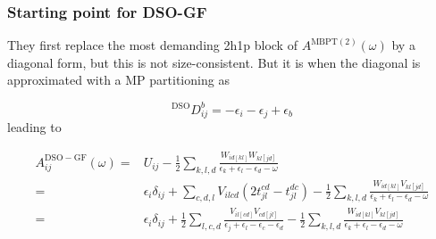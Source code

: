 \begin{frame}
\frametitle{Starting point for DSO-GF}
They first replace the most demanding 2h1p block of $A^{\mathrm{MBPT(2)}}(\omega)$ by a diagonal form, but this is not size-consistent. But it is when the diagonal is approximated with a MP partitioning as

\begin{equation*}
{ }^{\mathrm{DSO}} D_{i j}^{b}=-\epsilon_{i}-\epsilon_{j}+\epsilon_{b} \tag{10}
\end{equation*}
leading to

\begin{align}
A_{i j}^{\mathrm{DSO}-\mathrm{GF}}(\omega)=& U_{i j}-\frac{1}{2} \sum_{k, l, d} \frac{W_{i d[k l]} W_{k l[j d]}}{\epsilon_{k}+\epsilon_{l}-\epsilon_{d}-\omega} \\
= & \epsilon_{i} \delta_{ij}+\sum_{c, d, l} V_{i l c d}\left(2 t_{j l}^{c d}-t_{j l}^{d c}\right) -\frac{1}{2} \sum_{k, l, d} \frac{W_{i d[k l]} V_{k l[j d]}}{\epsilon_{k}+\epsilon_{l}-\epsilon_{d}-\omega} \\
= & \epsilon_{i} \delta_{i j}+\frac{1}{2} \sum_{l, c, d} \frac{V_{i l[c d]} V_{c d[j l]}}{\epsilon_{j}+\epsilon_{l}-\epsilon_{c}-\epsilon_{d}} -\frac{1}{2} \sum_{k, l, d} \frac{W_{i d[k l]} V_{k l[j d]}}{\epsilon_{k}+\epsilon_{l}-\epsilon_{d}-\omega}
\label{eq:dso_gf}
\end{align}
\end{frame}

